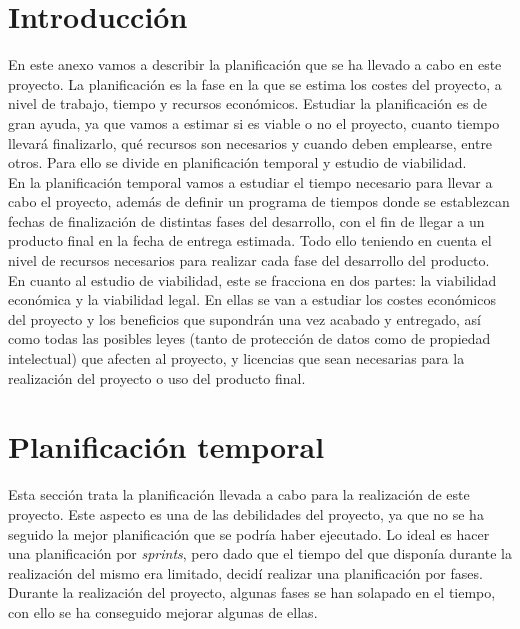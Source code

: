 
\section{Introducción}

En este anexo vamos a describir la planificación que se ha llevado a cabo en este proyecto. 
La planificación es la fase en la que se estima los costes del proyecto, a nivel de trabajo, tiempo y recursos económicos.
Estudiar la planificación es de gran ayuda, ya que vamos a estimar si es viable o no el proyecto, cuanto tiempo llevará finalizarlo, qué recursos son necesarios y cuando deben emplearse, entre otros. 
Para ello se divide en planificación temporal y estudio de viabilidad. \\

En la planificación temporal vamos a estudiar el tiempo necesario para llevar a cabo el proyecto, además de definir un programa de tiempos donde se establezcan fechas de finalización de distintas fases del desarrollo, con el fin de llegar a un producto final en la fecha de entrega estimada. Todo ello teniendo en cuenta el nivel de recursos necesarios para realizar cada fase del desarrollo del producto.\\

En cuanto al estudio de viabilidad, este se fracciona en dos partes: la viabilidad económica y la viabilidad legal. En ellas se van a estudiar los costes económicos del proyecto y los beneficios que supondrán una vez acabado y entregado, así como todas las posibles leyes (tanto de protección de datos como de propiedad intelectual) que afecten al proyecto, y licencias que sean necesarias para la realización del proyecto o uso del producto final.

\section{Planificación temporal}

Esta sección trata la planificación llevada a cabo para la realización de este proyecto.
Este aspecto es una de las debilidades del proyecto, ya que no se ha seguido la mejor planificación que se podría haber ejecutado.
Lo ideal es hacer una planificación por \textit{sprints}, pero dado que el tiempo del que disponía durante la realización del mismo era limitado, decidí realizar una planificación por fases. Durante la realización del proyecto, algunas fases se han solapado en el tiempo, con ello se ha conseguido mejorar algunas de ellas.

